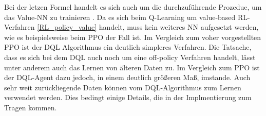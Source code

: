 Bei der letzen Formel handelt es sich auch um die durchzuführende Prozedue, um das Value-NN zu trainieren \cite{DRL}.
Da es sich beim Q-Learning um value-based RL-Verfahren \ref{RL_policy_value} handelt, muss kein weiteres NN aufgesetzt werden, wie es beispielsweise beim PPO der Fall ist. Im Vergleich zum voher vorgestellten PPO ist der DQL Algorithmus ein deutlich simpleres Verfahren. Die Tatsache, dass es sich bei dem DQL auch noch um eine off-policy Verfahren handelt, lässt unter anderem auch das Lernen von älteren Daten zu. Im Vergleich zum PPO ist der DQL-Agent dazu jedoch, in einem deutlich größeren Maß, imstande. Auch sehr weit zurückliegende Daten können vom DQL-Algorithmus zum Lernen verwendet werden. Dies bedingt einige Details, die in der Implmentierung zum Tragen kommen.\\




